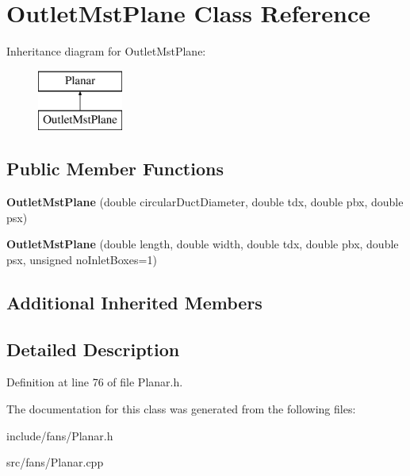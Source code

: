 \hypertarget{class_outlet_mst_plane}{}\section{Outlet\+Mst\+Plane Class Reference}
\label{class_outlet_mst_plane}
Inheritance diagram for Outlet\+Mst\+Plane\+:\begin{figure}[H]
\begin{center}
\leavevmode
\includegraphics[height=2.000000cm]{d6/de6/class_outlet_mst_plane}
\end{center}
\end{figure}
\subsection*{Public Member Functions}
\begin{DoxyCompactItemize}
\item 
\mbox{\label{class_outlet_mst_plane_a83a020ae8e9e225955ff409b0b9e53f6}} 
{\bfseries Outlet\+Mst\+Plane} (double circular\+Duct\+Diameter, double tdx, double pbx, double psx)
\item 
\mbox{\label{class_outlet_mst_plane_aa99159d73d39534ac936ad9431503bce}} 
{\bfseries Outlet\+Mst\+Plane} (double length, double width, double tdx, double pbx, double psx, unsigned no\+Inlet\+Boxes=1)
\end{DoxyCompactItemize}
\subsection*{Additional Inherited Members}


\subsection{Detailed Description}


Definition at line 76 of file Planar.\+h.



The documentation for this class was generated from the following files\+:\begin{DoxyCompactItemize}
\item 
include/fans/Planar.\+h\item 
src/fans/Planar.\+cpp\end{DoxyCompactItemize}
